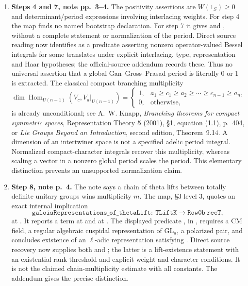 \documentclass[11pt,a4paper]{article}
\theoremstyle{definition}
\begin{document}
\begin{enumerate}
\item \textbf{Steps 4 and 7, note pp.~3--4.}
The positivity assertions are \(W(1_S)\geq0\) and determinant/period
expressions involving interlacing weights.  For step 4 the map finds no named
bootstrap declaration.  For step 7 it gives
 and
,
without a complete statement or normalization of the period.  Direct source
reading now identifies  as a predicate asserting
nonzero operator-valued Bessel integrals for some translates under explicit
interlacing, type, representation and Haar hypotheses; the official-source
addendum records these.  Thus no universal assertion that a global
Gan--Gross--Prasad period is literally
\(0\) or \(1\) is extracted.  The classical compact branching multiplicity
\[
 \dim\operatorname{Hom}_{U(n-1)}(V_c,V_a|_{U(n-1)})
 =\begin{cases}1,&a_1\geq c_1\geq a_2\geq\cdots\geq c_{n-1}\geq a_n,\\
 0,&\text{otherwise},\end{cases}
\]
is already unconditional; see A.~W. Knapp, \emph{Branching theorems for compact
symmetric spaces}, Representation Theory \textbf{5} (2001), \S1, equation
(1.1), p.~404, or \emph{Lie Groups Beyond an Introduction}, second edition,
Theorem~9.14.  A dimension of an intertwiner space is not a specified
adelic period integral.  Normalized compact-character integrals recover this
multiplicity, whereas scaling a vector in a nonzero global period scales the
period.  This elementary distinction prevents an unsupported normalization
claim.

\item \textbf{Step 8, note p.~4.}
The note says a chain of theta lifts between totally definite unitary groups
wins multiplicity \(m\).  The map, \S3 level 3, quotes an exact internal
implication
\[
 \mathtt{galoisRepresentations\_of\_thetaLift}
 :\ \mathtt{TLiftK}\longrightarrow\mathtt{Row0b\ recT},
\]
at
.
It reports a term  at
and  at .
The displayed predicate , in
,
requires a CM field, a regular algebraic cuspidal representation of
\(\mathrm{GL}_a\), a polarized pair, and concludes existence of an
\(\ell\)-adic representation satisfying .  Direct source
recovery now supplies both  and ; the latter
is a lift-existence statement with an existential rank threshold and explicit
weight and character conditions.  It is not the claimed chain-multiplicity
estimate with all constants.  The addendum gives the precise distinction.


\end{enumerate}
\end{document}
